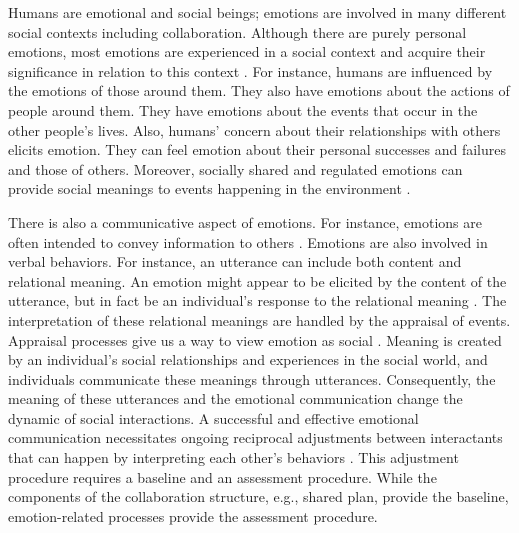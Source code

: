 Humans are emotional and social beings; emotions are involved in many different
social contexts including collaboration. Although there are purely personal
emotions, most emotions are experienced in a social context and acquire their
significance in relation to this context
\cite{parkinson:emotion-social-interaction}. For instance, humans are influenced
by the emotions of those around them. They also have emotions about the actions
of people around them. They have emotions about the events that occur in the
other people's lives. Also, humans' concern about their relationships with
others elicits emotion. They can feel emotion about their personal successes and
failures and those of others. Moreover, socially shared and regulated emotions
can provide social meanings to events happening in the environment
\cite{wisecup:sociology-emotions}.

There is also a communicative aspect of emotions. For instance, emotions are
often intended to convey information to others \cite{goffman:self-presentation}.
Emotions are also involved in verbal behaviors. For instance, an utterance can
include both content and relational meaning. An emotion might appear to be
elicited by the content of the utterance, but in fact be an individual's
response to the relational meaning \cite{planalp:communicating-emotion}. The
interpretation of these relational meanings are handled by the appraisal of
events. Appraisal processes give us a way to view emotion as social
\cite{hooft:sharing-emotions}. Meaning is created by an individual's social
relationships and experiences in the social world, and individuals communicate
these meanings through utterances. Consequently, the meaning of these utterances
and the emotional communication change the dynamic of social interactions. A
successful and effective emotional communication necessitates ongoing reciprocal
adjustments between interactants that can happen by interpreting each other's
behaviors \cite{parkinson:emotion-social-interaction}. This adjustment procedure
requires a baseline and an assessment procedure. While the components of the
collaboration structure, e.g., shared plan, provide the baseline,
emotion-related processes provide the assessment procedure.


